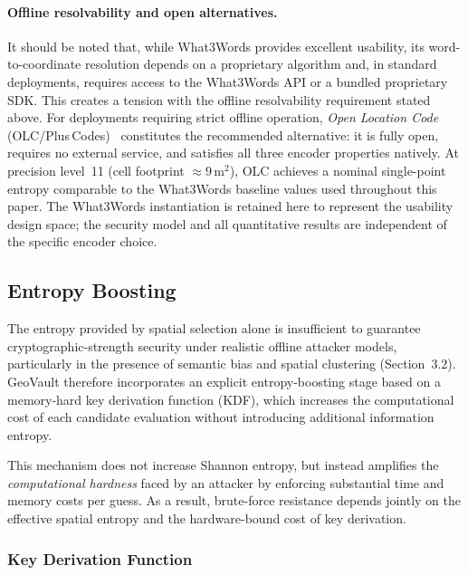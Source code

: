 \documentclass[journal,article,accept,pdftex,moreauthors]{Definitions/mdpi}
\begin{document}
\paragraph{Offline resolvability and open alternatives.} It should be noted that, while What3Words provides excellent usability, its word-to-coordinate resolution depends on a proprietary algorithm and, in standard deployments, requires access to the What3Words API or a bundled proprietary SDK. This creates a tension with the offline resolvability requirement stated above. For deployments requiring strict offline operation, \emph{Open Location Code} (OLC/Plus\,Codes)~\cite{Mai2022} constitutes the recommended alternative: it is fully open, requires no external service, and satisfies all three encoder properties natively. At precision level~11 (cell footprint $\approx 9\,\mathrm{m}^2$), OLC achieves a nominal single-point entropy comparable to the What3Words baseline values used throughout this paper. The What3Words instantiation is retained here to represent the usability design space; the security model and all quantitative results are independent of the specific encoder choice.

\subsection{Entropy Boosting}
\label{sec:entropy_boosting}

The entropy provided by spatial selection alone is insufficient to guarantee cryptographic-strength security under realistic offline attacker models, particularly in the presence of semantic bias and spatial clustering (Section~3.2). GeoVault therefore incorporates an explicit entropy-boosting stage based on a memory-hard key derivation function (KDF), which increases the computational cost of each candidate evaluation without introducing additional information entropy.

This mechanism does not increase Shannon entropy, but instead amplifies the \emph{computational hardness} faced by an attacker by enforcing substantial time and memory costs per guess. As a result, brute-force resistance depends jointly on the effective spatial entropy and the hardware-bound cost of key derivation.

\subsubsection{Key Derivation Function}
\label{sec:argon2_parameters}
\end{document}
